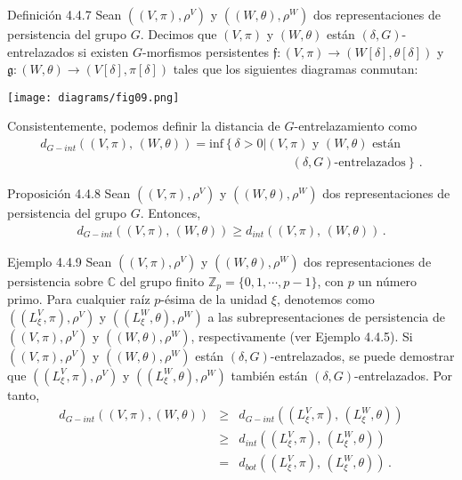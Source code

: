 \documentclass{beamer}
\begin{document}
\begin{frame}{Definici\'on 4.4.7}
Sean $((V,\pi),\rho^V)$ y $((W,\theta),\rho^W)$ dos representaciones de persistencia del grupo $G$. Decimos que $(V,\pi)$ y $(W,\theta)$ est\'an $(\delta,G)$-entrelazados si existen $G$-morfismos persistentes $\mathfrak{f}:(V,\pi)\rightarrow(W[\delta],\theta[\delta])$ y $\mathfrak{g}:(W,\theta)\rightarrow(V[\delta],\pi[\delta])$ tales que los siguientes diagramas conmutan:
\begin{center}
\texttt{[image: diagrams/fig09.png]}
\end{center}
\end{frame}


\begin{frame}
Consistentemente, podemos definir la distancia de $G$-entrelazamiento como
\begin{gather*}
d_{G-int}\left( (V,\pi),\,(W,\theta)\right)=\mbox{inf}\left\{\delta >0\vert (V,\pi) \mbox{ y } (W,\theta) \mbox{ est\'an }\right.\\
\, \hspace{20em} \left. (\delta,G)\mbox{-entrelazados} \right\}\,.
\end{gather*}

\vspace{2em}

\begin{block}{Proposici\'on 4.4.8}
Sean $((V,\pi),\rho^V)$ y $((W,\theta),\rho^W)$ dos representaciones de persistencia del grupo $G$. Entonces,
\begin{gather*}
d_{G-int}\left( (V,\pi),\,(W,\theta)\right)\geq d_{int}\left( (V,\pi),\,(W,\theta)\right)\,.
\end{gather*}
\end{block}
\end{frame}

\begin{frame}
\begin{block}{Ejemplo 4.4.9}
Sean $((V,\pi),\rho^V)$ y $((W,\theta),\rho^W)$ dos representaciones de persistencia sobre $\mathbb{C}$ del grupo finito $\mathbb{Z}_{p}=\{0,1,\cdots,p-1\}$, con $p$ un n\'umero primo. Para cualquier ra\'iz $p$-\'esima de la unidad $\xi$, denotemos como $((L_{\xi}^{V},\pi),\rho^V)$ y $((L_{\xi}^{W},\theta),\rho^W)$ a las subrepresentaciones de persistencia de $((V,\pi),\rho^V)$ y $((W,\theta),\rho^W)$, respectivamente (ver Ejemplo 4.4.5). Si $((V,\pi),\rho^V)$ y $((W,\theta),\rho^W)$ est\'an $(\delta,G)$-entrelazados, se puede demostrar que $((L_{\xi}^{V},\pi),\rho^V)$ y $((L_{\xi}^{W},\theta),\rho^W)$ tambi\'en est\'an $(\delta,G)$-entrelazados. Por tanto,
\begin{eqnarray*}
d_{G-int}((V,\pi),(W,\theta))&\geq& d_{G-int}\left( (L_{\xi}^{V},\pi), \,(L_{\xi}^{W},\theta)\right)\\
&\geq& d_{int}\left( (L_{\xi}^{V},\pi), \,(L_{\xi}^{W},\theta)\right)\\
&=&d_{bot}\left( (L_{\xi}^{V},\pi), \,(L_{\xi}^{W},\theta)\right)\,.
\end{eqnarray*}
\end{block}
\end{frame}
\end{document}
